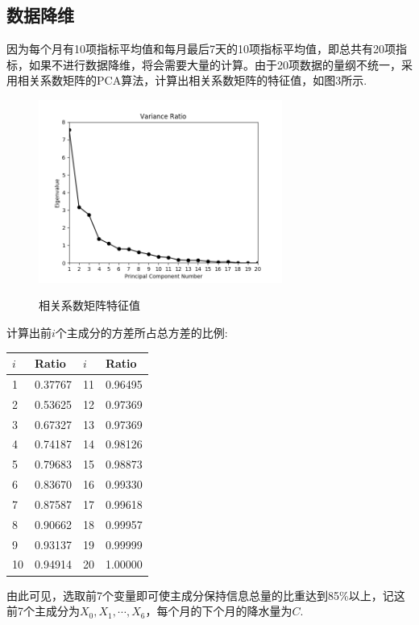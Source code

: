\documentclass{ctexart}
\begin{document}
\subsection{数据降维}
因为每个月有10项指标平均值和每月最后7天的10项指标平均值，即总共有20项指标，如果不进行数据降维，将会需要大量的计算。由于20项数据的量纲不统一，采用相关系数矩阵的PCA算法，计算出相关系数矩阵的特征值，如图3所示.
\begin{figure}[!h]
  \centering
  \includegraphics[width=8cm]{varRatio.png}\\
  \caption{{\fangsong 相关系数矩阵特征值}}
\end{figure}

计算出前$i$个主成分的方差所占总方差的比例:


  \begin{table}[!h]\center\footnotesize
\begin{tabular}{|l|l|l|l|}
\hline
$i$&Ratio&$i$&Ratio\\
\hline
1&0.37767&11&0.96495\\
\hline
2&0.53625&12&0.97369\\
\hline
3&0.67327&13&0.97369\\
\hline
4&0.74187&14&0.98126\\
\hline
5&0.79683&15&0.98873\\
\hline
6&0.83670&16&0.99330\\
\hline
7&0.87587&17&0.99618\\
\hline
8&0.90662&18&0.99957\\
\hline
9&0.93137&19&0.99999\\
\hline
10&0.94914&20&1.00000\\
\hline
\end{tabular}
\end{table}

由此可见，选取前7个变量即可使主成分保持信息总量的比重达到85\%以上，记这前7个主成分为$X_{0},X_{1},\cdots,X_{6}$，每个月的下个月的降水量为$C$.
\end{document}
